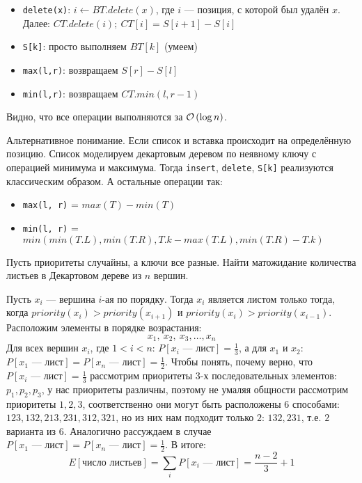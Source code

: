\begin{solution}
\begin{itemize}
	\item \texttt{delete(x)}: $i \leftarrow BT.delete(x)$, где $i$ --- позиция, с которой был удалён $x$. Далее: $CT.delete(i);\ CT[i] = S[i + 1] - S[i]$
	\item \texttt{S[k]}: просто выполняем $BT[k]$ (умеем)
	\item \texttt{max(l,r)}: возвращаем $S[r] - S[l]$
	\item \texttt{min(l,r)}: возвращаем $CT.min(l, r - 1)$
\end{itemize}
Видно, что все операции выполняются за $\mathcal{O}\left(\log{n}\right)$. \xqed
\begin{paragraph}{Альтернативное понимание.} Если список и вставка происходит на определённую позицию. Список моделируем декартовым деревом по неявному ключу с операцией минимума и максимума. Тогда \texttt{insert}, \texttt{delete}, \texttt{S[k]} реализуются классическим образом. А остальные операции так:
\begin{itemize}
 	\item \texttt{max(l, r)} = $max(T) - min(T)$
 	\item \texttt{min(l, r)} = $min(min(T.L), min(T.R), T.k - max(T.L), min(T.R) - T.k)$
\end{itemize} 
\end{paragraph}
\end{solution}

\begin{task}[3]
Пусть приоритеты случайны, а ключи все разные. Найти матожидание количества листьев в Декартовом дереве из $n$ вершин.
\end{task}
\begin{solution}
Пусть $x_i$ --- вершина $i$-ая по порядку. Тогда $x_i$ является листом только тогда, когда $priority(x_i) > priority(x_{i+1})$ и $priority(x_i) > priority(x_{i-1})$. Расположим элементы в порядке возрастания:
\[
	x_1,\ x_2,\ x_3, \ldots, x_n
\]
Для всех вершин $x_i$, где $1 < i < n$: $P[x_i \text{ --- лист}] = \frac{1}{3}$, а для $x_1$ и $x_2$: $P[x_1 \text{ --- лист}] = P[x_n \text{ --- лист}] = \frac{1}{2}$.
Чтобы понять, почему верно, что $P[x_i \text{ --- лист}] = \frac{1}{3}$ рассмотрим приоритеты 3-х последовательных элементов: $p_1, p_2, p_3$, у нас приоритеты различны, поэтому не умаляя общности рассмотрим приоритеты $1, 2, 3$, соответственно они могут быть расположены 6 способами: 
$123, 132, 213, 231, 312, 321$, но из них нам подходит только $2$: $132, 231$, т.е. $2$ варианта из $6$. Аналогично рассуждаем в случае $P[x_1 \text{ --- лист}] = P[x_n \text{ --- лист}] = \frac{1}{2}$.
В итоге:
\[
	E[\text{число листьев}] = \sum_{i}{P[x_i \text{ --- лист}]} = \frac{n - 2}{3} + 1
\]
\end{solution}

